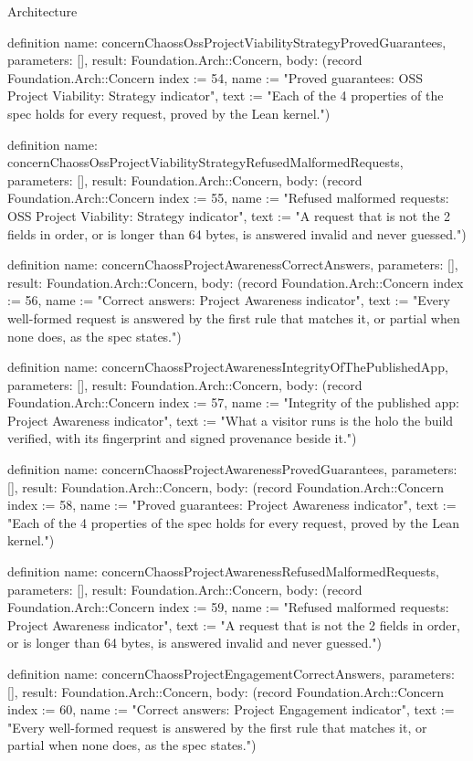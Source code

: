 \begin{lexlean}{Architecture}
\begin{semanticmodule}
definition{
  name: concernChaossOssProjectViabilityStrategyProvedGuarantees,
  parameters: [],
  result: Foundation.Arch::Concern,
  body: (record Foundation.Arch::Concern {index := 54, name := "Proved guarantees: OSS Project Viability: Strategy indicator", text := "Each of the 4 properties of the spec holds for every request, proved by the Lean kernel."})
}

definition{
  name: concernChaossOssProjectViabilityStrategyRefusedMalformedRequests,
  parameters: [],
  result: Foundation.Arch::Concern,
  body: (record Foundation.Arch::Concern {index := 55, name := "Refused malformed requests: OSS Project Viability: Strategy indicator", text := "A request that is not the 2 fields in order, or is longer than 64 bytes, is answered invalid and never guessed."})
}

definition{
  name: concernChaossProjectAwarenessCorrectAnswers,
  parameters: [],
  result: Foundation.Arch::Concern,
  body: (record Foundation.Arch::Concern {index := 56, name := "Correct answers: Project Awareness indicator", text := "Every well-formed request is answered by the first rule that matches it, or partial when none does, as the spec states."})
}

definition{
  name: concernChaossProjectAwarenessIntegrityOfThePublishedApp,
  parameters: [],
  result: Foundation.Arch::Concern,
  body: (record Foundation.Arch::Concern {index := 57, name := "Integrity of the published app: Project Awareness indicator", text := "What a visitor runs is the holo the build verified, with its fingerprint and signed provenance beside it."})
}

definition{
  name: concernChaossProjectAwarenessProvedGuarantees,
  parameters: [],
  result: Foundation.Arch::Concern,
  body: (record Foundation.Arch::Concern {index := 58, name := "Proved guarantees: Project Awareness indicator", text := "Each of the 4 properties of the spec holds for every request, proved by the Lean kernel."})
}

definition{
  name: concernChaossProjectAwarenessRefusedMalformedRequests,
  parameters: [],
  result: Foundation.Arch::Concern,
  body: (record Foundation.Arch::Concern {index := 59, name := "Refused malformed requests: Project Awareness indicator", text := "A request that is not the 2 fields in order, or is longer than 64 bytes, is answered invalid and never guessed."})
}

definition{
  name: concernChaossProjectEngagementCorrectAnswers,
  parameters: [],
  result: Foundation.Arch::Concern,
  body: (record Foundation.Arch::Concern {index := 60, name := "Correct answers: Project Engagement indicator", text := "Every well-formed request is answered by the first rule that matches it, or partial when none does, as the spec states."})
}


\end{semanticmodule}
\end{lexlean}
